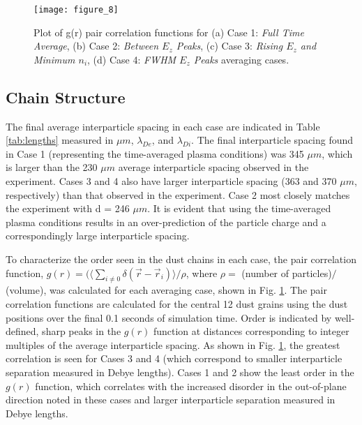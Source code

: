 \documentclass[aip,amsmath,amssymb,graphicx,floatfix,reprint]{revtex4-1}
\begin{document}
\begin{figure}[t]
\texttt{[image: figure\_8]}
\caption{Plot of g(r) pair correlation functions for (a) Case 1: \emph{Full Time Average}, (b) Case 2: \emph{Between $E_z$ Peaks}, (c) Case 3: \emph{Rising $E_z$ and Minimum $n_i$}, (d) Case 4: \emph{FWHM $E_z$ Peaks} averaging cases.}
\label{fig:gr_function}
\end{figure}

\subsection{Chain Structure}
\label{grtalk}
The final average interparticle spacing in each case are indicated in Table \ref{tab:lengths} measured in $\mu m$, $\lambda_{De}$, and $\lambda_{Di}$.  The final interparticle spacing found in Case 1 (representing the time-averaged plasma conditions) was 345 $\mu m$, which is larger than the 230 $\mu m$ average interparticle spacing observed in the experiment.  Cases 3 and 4 also have larger interparticle spacing (363 and 370 $\mu m$, respectively) than that observed in the experiment.  Case 2 most closely matches the experiment with d = 246 $\mu m$.  It is evident that using the time-averaged plasma conditions results in an over-prediction of the particle charge and a correspondingly large interparticle spacing.

To characterize the order seen in the dust chains in each case, the pair correlation function, $g(r)= (\langle\sum_{i\neq 0}\delta (\vec{r}-\vec{r}_i)\rangle/\rho$, where $\rho = $ (number of particles)$/$(volume), was calculated for each averaging case, shown in Fig. \ref{fig:gr_function}.  The pair correlation functions are calculated for the central 12 dust grains using the dust positions over the final 0.1 seconds of simulation time. Order is indicated by well-defined, sharp peaks in the $g(r)$ function at distances corresponding to integer multiples of the average interparticle spacing.  As shown in Fig. \ref{fig:gr_function}, the greatest correlation is seen for Cases 3 and 4 (which correspond to smaller interparticle separation measured in Debye lengths).  Cases 1 and 2 show the least order in the $g(r)$ function, which correlates with the increased disorder in the out-of-plane direction noted in these cases and larger interparticle separation measured in Debye lengths.
\end{document}
